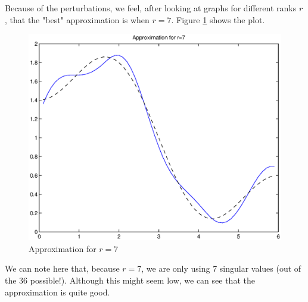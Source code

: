 Because of the perturbations, we feel, after looking at graphs for different ranks $r$, that the "best" approximation is when $r=7$. Figure \ref{rank7} shows the plot.

\begin{figure}
\begin{center}
\includegraphics[scale=0.7]{rank7.eps}
\caption{Approximation for $r=7$}
\label{rank7}
\end{center}
\end{figure} 

We can note here that, because $r=7$, we are only using 7 singular values (out of the 36 possible!). Although this might seem low, we can see that the approximation is quite good.